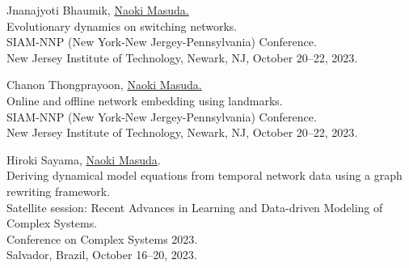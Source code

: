 \documentclass[11pt,letter]{article}
\begin{document}
\begin{etaremune}



\item Jnanajyoti Bhaumik, \underline{Naoki Masuda.}\\
Evolutionary dynamics on switching networks.\\
SIAM-NNP (New York-New Jergey-Pennsylvania) Conference.\\
New Jersey Institute of Technology, Newark, NJ, October 20--22, 2023.

\item Chanon Thongprayoon, \underline{Naoki Masuda.}\\
Online and offline network embedding using landmarks.\\
SIAM-NNP (New York-New Jergey-Pennsylvania) Conference.\\
New Jersey Institute of Technology, Newark, NJ, October 20--22, 2023.

\item Hiroki Sayama, \underline{Naoki Masuda}.\\
Deriving dynamical model equations from temporal network data using a graph rewriting framework.\\
Satellite session: Recent Advances in Learning and Data-driven Modeling of Complex Systems.\\
Conference on Complex Systems 2023.\\
Salvador, Brazil, October 16--20, 2023.
%


\end{etaremune}
\end{document}
